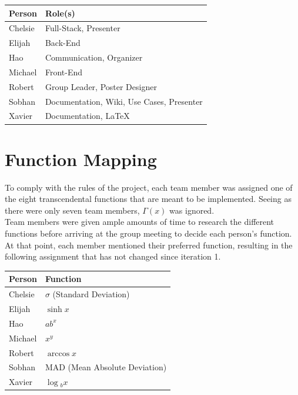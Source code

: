 \documentclass[11pt,onside]{report}
\begin{document}
\begin{center}
\begin{tabular}{|l|l|}
    \hline
    \bf{Person} & \bf{Role(s)}  \\
    \hline
    Chelsie & Full-Stack, Presenter \\
    \hline
    Elijah & Back-End \\
    \hline
    Hao & Communication, Organizer \\
    \hline
    Michael & Front-End\\
    \hline
    Robert & Group Leader, Poster Designer \\
    \hline
    Sobhan & Documentation, Wiki, Use Cases, Presenter \\
    \hline
    Xavier & Documentation, \LaTeX{} \\
    \hline
\end{tabular}
\end{center}

\section{Function Mapping}
To comply with the rules of the project, each team member was assigned one of the eight transcendental functions that are meant to be implemented. Seeing as there were only seven team members, $\Gamma{}(x)$ was ignored.\\

Team members were given ample amounts of time to research the different functions before arriving at the group meeting to decide each person's function. At that point, each member mentioned their preferred function, resulting in the following assignment that has not changed since iteration 1.
\begin{center}
\begin{tabular}{|l|l|}
    \hline
    \bf{Person} & \bf{Function}  \\
    \hline
    Chelsie & $\sigma{}$ (Standard Deviation) \\
    \hline
    Elijah & $\sinh{x}$ \\
    \hline
    Hao & $ab^x$ \\
    \hline
    Michael & $x^y$ \\
    \hline
    Robert & $\arccos{x}$ \\
    \hline
    Sobhan & MAD (Mean Absolute Deviation) \\
    \hline
    Xavier & $\log{}_bx$ \\
    \hline
\end{tabular}
\end{center}
\end{document}
